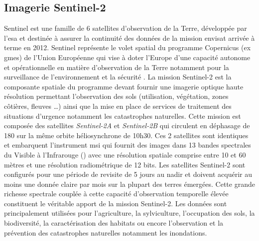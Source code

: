   \subsection{Imagerie Sentinel-2}

Sentinel est une famille de 6 satellites d'observation de la Terre, développée par l'\acrshort{esa} et destinée à assurer la continuité des données de la mission \acrshort{envisat} arrivée à 
terme en 2012. Sentinel représente le volet spatial du programme Copernicus (ex \acrshort{gmes}) de l'Union Européenne qui vise à doter l'Europe d'une capacité autonome et 
opérationnelle en matière d'observation de la Terre notamment pour la surveillance de l'environnement et la sécurité \citep{Drusch2012}. La mission Sentinel-2 est la composante spatiale du programme 
devant fournir une imagerie optique haute résolution permettant l’observation des sols (utilisation, végétation, zones côtières, fleuves \ldots) ainsi que la mise en place de services 
de traitement des situations d'urgence notamment les catastrophes naturelles. Cette mission est composée des satellites \emph{Sentinel-2A} et \emph{Sentinel-2B} qui circulent
en déphasage de 180\textdegree{} sur la même orbite héliosynchrone de 10h30. Ces 2 satellites sont identiques et embarquent l'instrument \acrshort{msi} qui fournit des images dans 13 bandes spectrales 
du Visible à l'Infrarouge () avec une résolution spatiale comprise entre 10 et 60 mètres et une résolution radiométrique de 12 bits. Les satellites Sentinel-2 sont configurés pour une période 
de revisite de 5 jours au nadir et doivent acquérir au moins une donnée claire par mois sur la plupart des terres émergées. 
Cette grande richesse spectrale couplée à cette capacité d'observation temporelle élevée constituent le véritable apport de la mission Sentinel-2. Les données sont principalement 
utilisées pour l'agriculture, la sylviculture, l'occupation des sols, la biodiversité, la caractérisation des habitats ou encore l'observation et la prévention des catastrophes 
naturelles notamment les inondations. 


